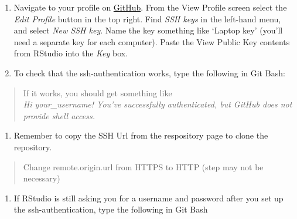 \documentclass[12pt,]{article}
\providecommand{\tightlist}{%
  \setlength{\itemsep}{0pt}\setlength{\parskip}{0pt}}
\begin{document}
\begin{enumerate}
\def\labelenumi{\arabic{enumi}.}
\setcounter{enumi}{8}
\item
  Navigate to your profile on \href{www.github.com}{GitHub}. From the
  View Profile screen select the \emph{Edit Profile} button in the top
  right. Find \emph{SSH keys} in the left-hand menu, and select
  \emph{New SSH key}. Name the key something like `Laptop key' (you'll
  need a separate key for each computer). Paste the View Public Key
  contents from RStudio into the \emph{Key} box.
\item
  To check that the ssh-authentication works, type the following in Git
  Bash:
\end{enumerate}

\begin{quote}
\colorbox{light-gray}{}
\end{quote}

\begin{quote}
If it works, you should get something like\\
\emph{Hi your\_username! You've successfully authenticated, but GitHub
does not provide shell access.}
\end{quote}

\begin{enumerate}
\def\labelenumi{\arabic{enumi}.}
\setcounter{enumi}{10}
\tightlist
\item
  Remember to copy the SSH Url from the respository page to clone the
  repository.
\end{enumerate}

\begin{quote}
Change remote.origin.url from HTTPS to HTTP (step may not be necessary)
\end{quote}

\begin{enumerate}
\def\labelenumi{\arabic{enumi}.}
\setcounter{enumi}{11}
\tightlist
\item
  If RStudio is still asking you for a username and password after you
  set up the ssh-authentication, type the following in Git Bash
\end{enumerate}

\begin{quote}
\colorbox{light-gray}{}
\end{quote}

\begin{quote}
\colorbox{light-gray}{}
\end{quote}
\end{document}
